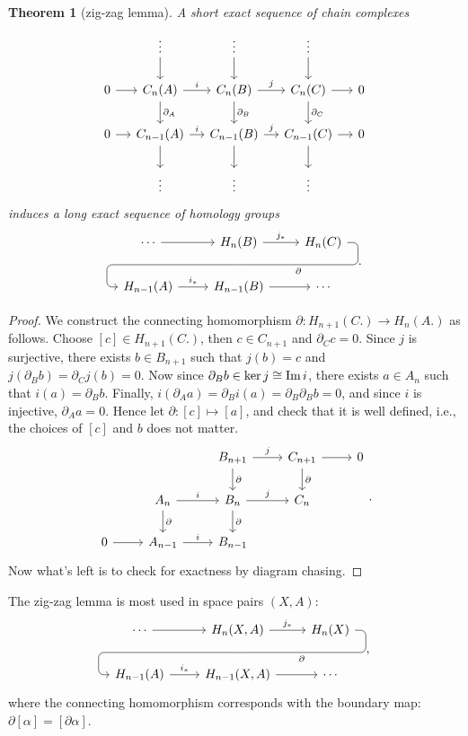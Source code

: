 \documentclass[11pt]{article}
\theoremstyle{definition}
\theoremstyle{plain}
\newtheorem{theorem}{Theorem}[section]
\newcommand{\im}{\textup{Im}\,}
\newcommand{\1}{\mathbf{1}}
\begin{document}
\begin{theorem}[zig-zag lemma]
A short exact sequence of chain complexes
\[\begin{tikzcd}[column sep=small]
&\vdots\arrow{d}&\vdots\arrow{d}&\vdots\arrow{d}\\
0\arrow{r}&C_n(A)\arrow{d}{\partial_A}\arrow{r}{i}&C_n(B)\arrow{d}{\partial_B}\arrow{r}{j}&C_n(C)\arrow{d}{\partial_C}\arrow{r}&0\\
0\arrow{r}&C_{n-1}(A)\arrow{d}\arrow{r}{i}&C_{n-1}(B)\arrow{d}\arrow{r}{j}&C_{n-1}(C)\arrow{d}\arrow{r}&0\\
&\vdots&\vdots&\vdots
\end{tikzcd}\]
induces a long exact sequence of homology groups
\[\begin{tikzcd}
\cdots \arrow[r]
& H_n(B) \arrow{r}{j_\ast}
\arrow[d, phantom, ""{coordinate, name=Z}]
& H_n(C) \arrow[dll,
"\partial",
rounded corners,
to path={ -- ([xshift=2ex]\tikztostart.east)
|- (Z) [near end]\tikztonodes
-| ([xshift=-2ex]\tikztotarget.west)
-- (\tikztotarget)}] \\
H_{n-1}(A) \arrow{r}{i_\ast}
& H_{n-1}(B) \arrow[r]
& \cdots
\end{tikzcd}.\]
\end{theorem}
\begin{proof}
We construct the connecting homomorphism $\partial:H_{n+1}(C.)\to H_n(A.)$ as follows. Choose $[c]\in H_{n+1}(C.)$, then $c\in C_{n+1}$ and $\partial_C c=0$. Since $j$ is surjective, there exists $b\in B_{n+1}$ such that $j(b)=c$ and $j(\partial_Bb)=\partial_Cj(b)=0$. Now since $\partial_Bb\in\ker j\cong\im i$, there exists $a\in A_n$ such that $i(a)=\partial_Bb$. Finally, $i(\partial_Aa)=\partial_Bi(a)=\partial_B\partial_Bb=0$, and since $i$ is injective, $\partial_Aa=0$. Hence let $\partial:[c]\mapsto[a]$, and check that it is well defined, i.e., the choices of $[c]$ and $b$ does not matter.
\[\begin{tikzcd}
&&B_{n+1}\arrow{d}{\partial}\arrow{r}{j}&C_{n+1}\arrow{d}{\partial}\arrow{r}&0\\
&A_n\arrow{d}{\partial}\arrow{r}{i}&B_n\arrow{d}{\partial}\arrow{r}{j}&C_n\\
0\arrow{r}&A_{n-1}\arrow{r}{i}&B_{n-1}
\end{tikzcd}.\]
Now what's left is to check for exactness by diagram chasing.
\end{proof}

The zig-zag lemma is most used in space pairs $(X,A)$:
\[\begin{tikzcd}
\cdots \arrow[r]
& H_n(X,A) \arrow{r}{j_\ast}
\arrow[d, phantom, ""{coordinate, name=Z}]
& H_n(X) \arrow[dll,
"\partial",
rounded corners,
to path={ -- ([xshift=2ex]\tikztostart.east)
|- (Z) [near end]\tikztonodes
-| ([xshift=-2ex]\tikztotarget.west)
-- (\tikztotarget)}] \\
H_{n-1}(A) \arrow{r}{i_\ast}
& H_{n-1}(X,A) \arrow[r]
& \cdots
\end{tikzcd},\]
where the connecting homomorphism corresponds with the boundary map: $\partial[\alpha]=[\partial\alpha]$.\medbreak
\end{document}
